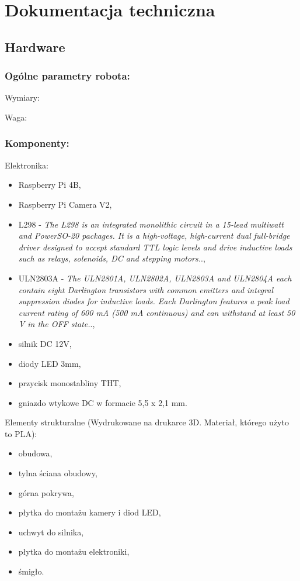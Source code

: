 \section{Dokumentacja techniczna}
\subsection{Hardware}
\subsubsection{Ogólne parametry robota:}
Wymiary: 

Waga:

\subsubsection{Komponenty:}
Elektronika:
    \begin{itemize}
        \item Raspberry Pi 4B,
        \item Raspberry Pi Camera V2,
        \item L298 - \textit{The L298 is an integrated monolithic circuit in a 15-lead multiwatt and PowerSO-20
        packages. It is a high-voltage, high-current dual full-bridge driver designed to accept
        standard TTL logic levels and drive inductive loads such as relays, solenoids, DC
        and stepping motors.}.\cite{L298},
        \item ULN2803A - \textit{The ULN2801A, ULN2802A, ULN2803A and
        ULN2804A each contain eight Darlington
        transistors with common emitters and integral
        suppression diodes for inductive loads. Each
        Darlington features a peak load current rating of
        600 mA (500 mA continuous) and can withstand
        at least 50 V in the OFF state.}.\cite{ULN2803a},
        \item silnik DC 12V,
        \item diody LED 3mm,
        \item przycisk monostabliny THT,
        \item gniazdo wtykowe DC w formacie 5,5 x 2,1 mm.
    \end{itemize}

Elementy strukturalne (Wydrukowane na drukarce 3D. Materiał, którego użyto to PLA):
    \begin{itemize}
        \item obudowa,
        \item tylna ściana obudowy,
        \item górna pokrywa,
        \item płytka do montażu kamery i diod LED,
        \item uchwyt do silnika,
        \item płytka do montażu elektroniki,
        \item śmigło.
    \end{itemize}\


